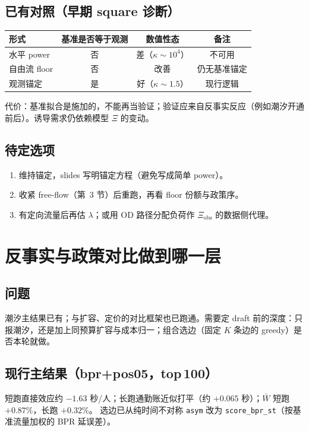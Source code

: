 \documentclass[11pt,a4paper]{article}
\begin{document}
\subsection*{已有对照（早期 square 诊断）}
\begin{center}
\begin{tabular}{lccc}
\toprule
形式 & 基准是否等于观测 & 数值性态 & 备注 \\
\midrule
水平 power & 否 & 差（$\kappa\sim 10^4$） & 不可用 \\
自由流 floor & 否 & 改善 & 仍无基准锚定 \\
观测锚定 & 是 & 好（$\kappa\sim 1.5$） & 现行逻辑 \\
\bottomrule
\end{tabular}
\end{center}
代价：基准拟合是施加的，不能再当验证；验证应来自反事实反应（例如潮汐开通前后）。诱导需求仍依赖模型 $\Xi$ 的变动。

\subsection*{待定选项}
\begin{enumerate}[nosep]
  \item 维持锚定，slides 写明锚定方程（避免写成简单 power）。
  \item 收紧 free-flow（第~3 节）后重跑，再看 floor 份额与政策序。
  \item 有定向流量后再估 $\lambda$；或用 OD 路径分配负荷作 $\Xi_{\mathrm{obs}}$ 的数据侧代理。
\end{enumerate}

\section{反事实与政策对比做到哪一层}

\subsection*{问题}
潮汐主结果已有；与扩容、定价的对比框架也已跑通。需要定 draft 前的深度：只报潮汐，还是加上同预算扩容与成本归一；组合选边（固定 $K$ 条边的 greedy）是否本轮就做。

\subsection*{现行主结果（bpr+pos05，top\,100）}
短跑直接效应约 $-1.63$ 秒/人；长跑通勤账近似打平（约 $+0.065$ 秒）；$\bar W$ 短跑 $+0.87\%$，长跑 $+0.32\%$。
选边已从纯时间不对称 \texttt{asym} 改为 \texttt{score\_bpr\_st}（按基准流量加权的 BPR 延误差）。
\end{document}

